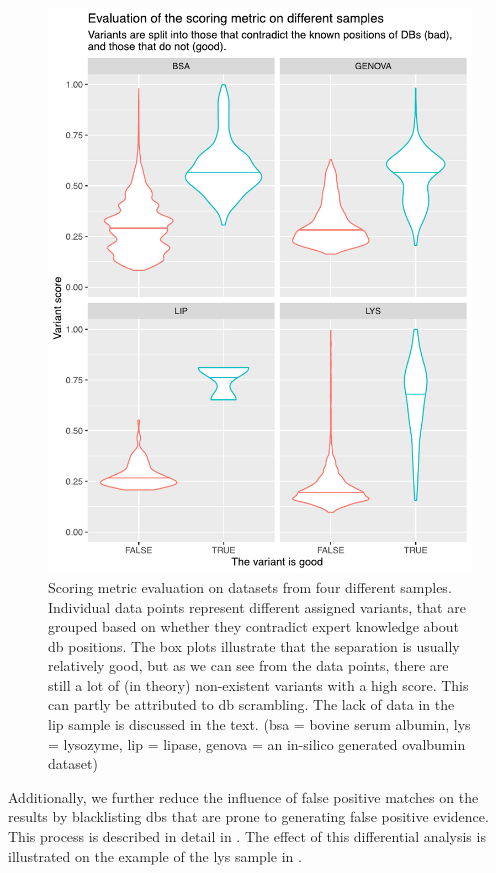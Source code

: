 \begin{figure}
  \centering
  \includegraphics[width=0.85\linewidth]{img/scoring-metric-evaluation.pdf}
  \caption{Scoring metric evaluation on datasets from four different samples. Individual data points represent different assigned variants, that are grouped based on whether they contradict expert knowledge about \gls*{db} positions. The box plots illustrate that the separation is usually relatively good, but as we can see from the data points, there are still a lot of (in theory) non-existent variants with a high score. This can partly be attributed to \gls*{db} scrambling. The lack of data in the \gls*{lip} sample is discussed in the text. (\gls*{bsa} = bovine serum albumin, \gls*{lys} = lysozyme, \gls*{lip} = lipase, \gls*{genova} = an in-silico generated ovalbumin dataset)}\label{fig:scoring-metric}
\end{figure}

Additionally, we further reduce the influence of false positive matches on the results by blacklisting \glspl*{db} that are prone to generating false positive evidence. This process is described in detail in . The effect of this differential analysis is illustrated on the example of the \gls*{lys} sample in  .


